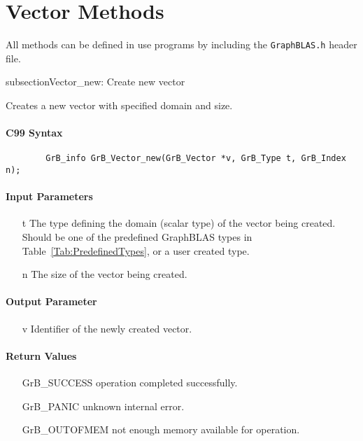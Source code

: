\section{Vector Methods}

All methods can be defined in use programs by including the {\tt GraphBLAS.h} header file.

subsection{{\sf Vector\_new}: Create new vector}

Creates a new vector with specified domain and size.

\paragraph{C99 Syntax}

\begin{verbatim}
        GrB_info GrB_Vector_new(GrB_Vector *v, GrB_Type t, GrB_Index n);
\end{verbatim}

\paragraph{Input Parameters}

\begin{itemize}[leftmargin=1.1in]
    \item[{\sf t}] The type defining the domain (scalar type) of the vector being created.
    Should be one of the predefined
    GraphBLAS types in Table~\ref{Tab:PredefinedTypes}, or a user created type.
    \item[{\sf n}] The size of the vector being created.
\end{itemize}

\paragraph{Output Parameter}

\begin{itemize}[leftmargin=1.1in]
    \item[{\sf v}] Identifier of the newly created vector.
\end{itemize}

\paragraph{Return Values}

\begin{itemize}[leftmargin=2.1in]
\item[{\sf GrB\_SUCCESS}]    operation completed successfully. \\
\item[{\sf GrB\_PANIC}]      unknown internal error. \\
\item[{\sf GrB\_OUTOFMEM}]   not enough memory available for operation. \\
\end{itemize}

